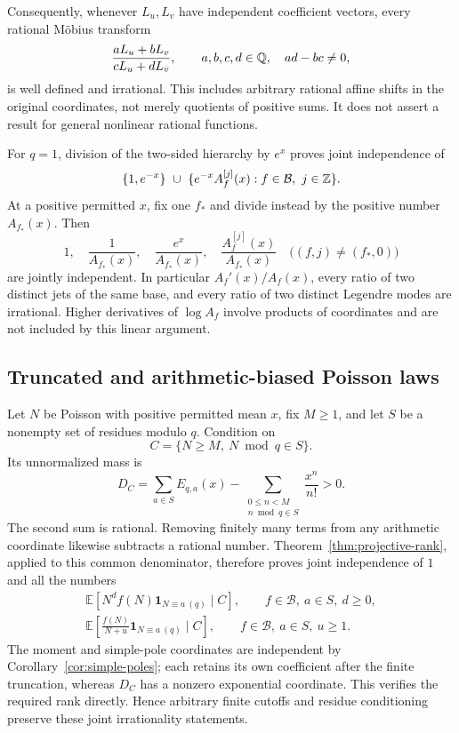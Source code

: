 Consequently, whenever $L_u,L_v$ have independent coefficient vectors,
every rational M\"obius transform
\[
 \frac{aL_u+bL_v}{cL_u+dL_v},
 \qquad a,b,c,d\in\mathbb Q,\quad ad-bc\ne0,
\]
is well defined and irrational.  This includes arbitrary rational affine
shifts in the original coordinates, not merely quotients of positive sums.
It does not assert a result for general nonlinear rational functions.

For $q=1$, division of the two-sided hierarchy by $e^x$ proves joint
independence of
\[
 \{1,e^{-x}\}\ \cup\
 \{e^{-x}A_f^{[j]}(x):f\in\mathcal B,\ j\in\Z\}.
\]
At a positive permitted $x$, fix one $f_*$ and divide instead by the
positive number $A_{f_*}(x)$.  Then
\[
 1,\quad\frac1{A_{f_*}(x)},\quad
 \frac{e^x}{A_{f_*}(x)},\quad
 \frac{A_f^{[j]}(x)}{A_{f_*}(x)}
 \quad\bigl((f,j)\ne(f_*,0)\bigr)
\]
are jointly independent.  In particular $A_f'(x)/A_f(x)$, every ratio of
two distinct jets of the same base, and every ratio of two distinct
Legendre modes are irrational.  Higher derivatives of $\log A_f$ involve
products of coordinates and are not included by this linear argument.

\subsection{Truncated and arithmetic-biased Poisson laws}

Let $N$ be Poisson with positive permitted mean $x$, fix $M\geq1$, and
let $S$ be a nonempty set of residues modulo $q$.  Condition on
\[
 C=\{N\geq M,\ N\bmod q\in S\}.
\]
Its unnormalized mass is
\[
 D_C=\sum_{a\in S}E_{q,a}(x)
   -\sum_{\substack{0\leq n<M\\n\bmod q\in S}}\frac{x^n}{n!}>0.
\]
The second sum is rational.  Removing finitely many terms from any
arithmetic coordinate likewise subtracts a rational number.
Theorem~\ref{thm:projective-rank}, applied to this common denominator,
therefore proves joint independence of $1$ and all the numbers
\begin{gather*}
 \mathbb E\!\left[N^d f(N)\mathbf1_{N\equiv a\ (q)}\mid C\right],
       \qquad f\in\mathcal B,\ a\in S,\ d\geq0,\\
 \mathbb E\!\left[\frac{f(N)}{N+u}
          \mathbf1_{N\equiv a\ (q)}\mid C\right],
       \qquad f\in\mathcal B,\ a\in S,\ u\geq1.
\end{gather*}
The moment and simple-pole coordinates are independent by
Corollary~\ref{cor:simple-poles}; each retains its own coefficient after
the finite truncation, whereas $D_C$ has a nonzero exponential coordinate.
This verifies the required rank directly.  Hence arbitrary finite cutoffs
and residue conditioning preserve these joint irrationality statements.

